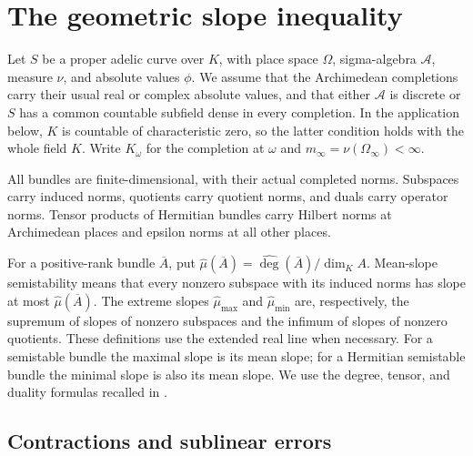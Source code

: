 \chapter{The geometric slope inequality}

Let $S$ be a proper adelic curve over $K$, with place space $\Omega$,
sigma-algebra $\mathcal A$, measure $\nu$, and absolute values $\phi$.
We assume that the Archimedean completions carry their usual real or complex
absolute values, and that either $\mathcal A$ is discrete or $S$ has a common
countable subfield dense in every completion. In the application below, $K$ is
countable of characteristic zero, so the latter condition holds with the whole
field $K$. Write $K_\omega$ for the completion at $\omega$ and
$m_\infty=\nu(\Omega_\infty)<\infty$.

All bundles are finite-dimensional, with their actual completed norms.
Subspaces carry induced norms, quotients carry quotient norms, and duals carry
operator norms. Tensor products of Hermitian bundles carry Hilbert norms at
Archimedean places and epsilon norms at all other places.

For a positive-rank bundle $\overline A$, put
$\widehat\mu(\overline A)=\widehat{\deg}(\overline A)/\dim_K A$.
Mean-slope semistability means that every nonzero subspace with its induced
norms has slope at most $\widehat\mu(\overline A)$.
The extreme slopes $\widehat\mu_{\max}$ and $\widehat\mu_{\min}$ are,
respectively, the supremum of slopes of nonzero subspaces and the infimum of
slopes of nonzero quotients. These definitions use the extended real line when
necessary. For a semistable bundle the maximal slope is its mean slope; for a
Hermitian semistable bundle the minimal slope is also its mean slope.
We use the degree, tensor, and duality formulas recalled in
\cite[Section 2.4]{bost2026}.

\section{Contractions and sublinear errors}


